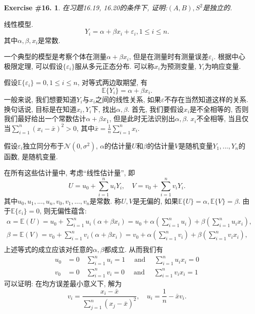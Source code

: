 \documentclass[UTF8, a4paper]{article}
\newtheorem{exercise}{Exercise \#16.}
\begin{document}
\begin{exercise}
在习题16.19, 16.20的条件下, 证明:\((A, B), S^2\)是独立的.
\end{exercise}


\begin{framed}
线性模型.
$$
Y_i = \alpha + \beta x_i + \varepsilon_i, 1 \leq i \leq n.
$$
其中\(\alpha, \beta, x_i\)是常数.

一个典型的模型是考察个体在测量\(\alpha + \beta x_i\), 但是在测量时有测量误差\(\varepsilon_i\).
根据中心极限定理, 可以假设\(\{\varepsilon_i\}\)服从多元正态分布. 可以称\(x_i\)为预测变量, \(Y_i\)为响应变量.

假设\(\mathbb{E}\{\varepsilon_i\} = 0, 1\leq i\leq n\), 对等式两边取期望, 有 
$$
\mathbb{E}\{Y_i\} = \alpha + \beta x_i.
$$
一般来说, 我们想要知道\(Y_i\)与\(x_i\)之间的线性关系, 如果\(\varepsilon\)不存在当然知道这样的关系. 换句话说, 目标是在知道\(x_i, Y_i\)下, 找出\(\alpha, \beta\).
首先, 我们要假设\(x_i\)是不全相等的, 否则我们最好给出一个常数估计\(\alpha + \beta x_1\), 但是此时无法识别出\(\alpha, \beta\). 
\(x_i\)不全相等, 当且仅当\(\sum_{i=1}^{n}(x_i - \bar{x})^2 > 0\), 其中\(\bar{x} = \frac{1}{n}\sum_{i=1}^{n}x_i\).

假设\(\varepsilon_i\)独立同分布于\(\mathcal{N}(0, \sigma^2)\), \(\alpha\)的估计量\(U\)和\(\beta\)的估计量\(V\)是随机变量\(Y_1, ..., Y_n\)的函数, 是随机变量.

在所有这些估计量中, 考虑``线性估计量'', 即 
$$
U = u_0 + \sum_{i=1}^{n}u_i Y_i, \quad V = v_0 + \sum_{i=1}^{n}v_i Y_i.
$$
其中\(u_0, u_1, ..., u_n, v_0, v_1, ..., v_n\)是常数. 称\(U, V\)是无偏的, 如果\(\mathbb{E}\{U\} = \alpha, \mathbb{E}\{V\} = \beta\).
由于\(\mathbb{E}\{\varepsilon_i\} = 0\), 则无偏性蕴含:
$$
\begin{gathered}
\alpha = \mathbb{E}(U) = u_0 + \sum_{i=1}^{n}u_i(\alpha + \beta x_i) = u_0 + \alpha\left(\sum_{i=1}^{n}u_i \right) + \beta \left(\sum_{i=1}^{n}u_i x_i\right), \\
\beta = \mathbb{E}(V) = v_0 + \sum_{i=1}^{n}v_i(\alpha + \beta x_i) = v_0 + \alpha \left(\sum_{i=1}^{n}v_i \right) + \beta \left(\sum_{i=1}^{n}v_i x_i\right), \\
\end{gathered}
$$
上述等式的成立应该对任意的\(\alpha, \beta\)都成立. 从而我们有
$$
\begin{aligned}
u_0 & =0 \quad \sum_{i=1}^n u_i=1 \quad \text { and } \quad \sum_{i=1}^n u_i x_i=0 \\
v_0 & =0 \quad \sum_{i=1}^n v_i=0 \quad \text { and } \quad \sum_{i=1}^n v_i x_i=1
\end{aligned}
$$
可以证明: 在均方误差最小意义下, 解为 
$$
v_i = \frac{x_i - \bar{x}}{\sum_{j=1}^{n}(x_j - \bar{x})^2}, \quad u_i = \frac{1}{n} - \bar{x}v_i.
$$
\end{framed}



\end{document}
